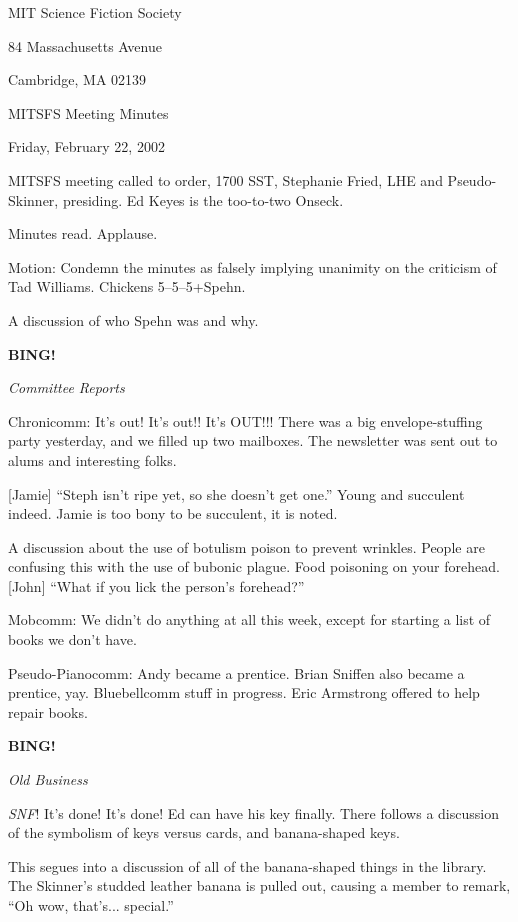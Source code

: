 \documentclass[12pt]{article}
\newcommand{\bing}{{\bf BING!} }
\newcommand{\goto}[1]{\bing \vskip 12pt \centerline{{\em{#1}}}}
\begin{document}
\begin{center}

MIT Science Fiction Society 

84 Massachusetts Avenue

Cambridge, MA 02139

\vspace{12pt}

MITSFS Meeting Minutes 

Friday, February 22, 2002

\end{center}
 
\vspace{18pt}

\setlength{\parskip}{6pt}

\noindent
MITSFS meeting called to order, 1700 SST, Stephanie Fried, LHE and
Pseudo-Skinner, presiding.  Ed Keyes is the too-to-two Onseck.

Minutes read.  Applause.

Motion: Condemn the minutes as falsely implying unanimity on the
criticism of Tad Williams.  Chickens 5--5--5+Spehn.

A discussion of who Spehn was and why.

\goto{Committee Reports}

Chronicomm: It's out!  It's out!!  It's OUT!!!  There was a big
envelope-stuffing party yesterday, and we filled up two mailboxes.
The newsletter was sent out to alums and interesting folks.

[Jamie] ``Steph isn't ripe yet, so she doesn't get one.''  Young and
succulent indeed.  Jamie is too bony to be succulent, it is noted.

A discussion about the use of botulism poison to prevent wrinkles.
People are confusing this with the use of bubonic plague.  Food
poisoning on your forehead.  [John] ``What if you lick the person's
forehead?''

Mobcomm: We didn't do anything at all this week, except for starting
a list of books we don't have.

Pseudo-Pianocomm: Andy became a prentice.  Brian Sniffen also became
a prentice, yay.  Bluebellcomm stuff in progress.  Eric Armstrong
offered to help repair books.

\goto{Old Business}

{\em SNF}!  It's done!  It's done!  Ed can have his key finally.
There follows a discussion of the symbolism of keys versus cards,
and banana-shaped keys.

This segues into a discussion of all of the banana-shaped things
in the library.  The Skinner's studded leather banana is pulled out,
causing a member to remark, ``Oh wow, that's... special.''
\end{document}
